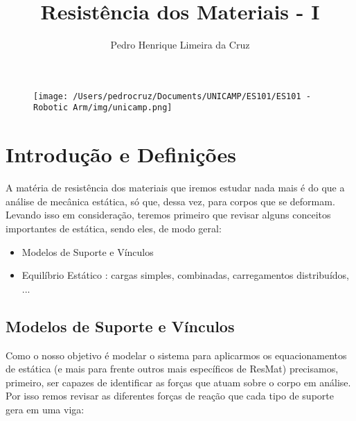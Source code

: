 \documentclass{article}
\author{Pedro Henrique Limeira da Cruz}
\title{Resistência dos Materiais - I}
\begin{document}
    \maketitle
    \thispagestyle{empty}

    \begin{figure}[h]
        \begin{center}
            \texttt{[image: /Users/pedrocruz/Documents/UNICAMP/ES101/ES101 - Robotic Arm/img/unicamp.png]}
        \end{center}
    \end{figure}

    \newpage
    \tableofcontents
    \newpage

    \section{Introdução e Definições}

        A matéria de resistência dos materiais que iremos estudar nada mais é do que a análise de mecânica estática, só que, dessa vez, para corpos que se deformam.
        Levando isso em consideração, teremos primeiro que revisar alguns conceitos importantes de estática, sendo eles, de modo geral:
        \begin{itemize}
            \item Modelos de Suporte e Vínculos
            \item Equilíbrio Estático : cargas simples, combinadas, carregamentos distribuídos, ...
        \end{itemize}

        \subsection{Modelos de Suporte e Vínculos}

            Como o nosso objetivo é modelar o sistema para aplicarmos os equacionamentos de estática (e mais para frente outros mais específicos de ResMat) precisamos, primeiro, ser capazes de
            identificar as forças que atuam sobre o corpo em análise. Por isso remos revisar as diferentes forças de reação que cada tipo de suporte gera em uma viga:
\end{document}
